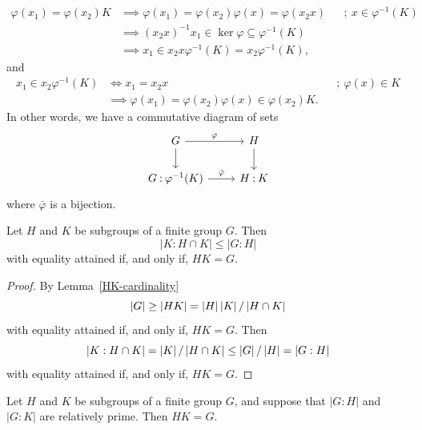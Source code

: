 \begin{rem}
\begin{enumerate}[-]
        \begin{align*}
            \varphi(x_1)=\varphi(x_2)K &\implies \varphi(x_1)=\varphi(x_2)\varphi(x)
                    =\varphi(x_2x)
                    &&;\ x\in\varphi^{-1}(K)\\
                &\implies (x_2x)^{-1}x_1\in\ker\varphi\subseteq\varphi^{-1}(K)\\
                &\implies x_1\in x_2x\varphi^{-1}(K)=x_2\varphi^{-1}(K),
        \end{align*}
        and
        \begin{align*}
            x_1\in x_2\varphi^{-1}(K)
                &\iff x_1=x_2x&&;\ \varphi(x)\in K\\
                &\implies \varphi(x_1)=\varphi(x_2)\varphi(x)\in\varphi(x_2)K. 
        \end{align*}
        In other words, we have a commutative diagram of sets
        \begin{equation}\label{diag:isomorphic-coclasses}
            \begin{tikzcd}
                G
                        \arrow[r,"\varphi"]
                        \arrow[d]
                    &H
                        \arrow[d]\\
                \lco G{\varphi^{-1}(K)}
                        \arrow[r,"\bar\varphi"]
                    &\lco HK
            \end{tikzcd}
        \end{equation}
        where $\bar\varphi$ is a bijection.
    \end{enumerate}
\end{rem}

\begin{cor}\label{index-inequality}
    Let $H$ and $K$ be subgroups of a finite group $G$. Then
    $$
        |K:H \cap K| \le |G:H|
    $$
    with equality attained if, and only if, $HK = G$.
\end{cor}

\begin{proof} By Lemma~\ref{HK-cardinality}
$$
    \left\vert{G}\right\vert\ge\left\vert{HK}\right\vert=\left\vert{H}\right\vert\left\vert{K}\right\vert/\left\vert{H\cap K}\right\vert
$$
with equality attained if, and only if, $HK=G$. Then
$$
    \left\vert{K:H\cap K}\right\vert = \left\vert{K}\right\vert/\left\vert{H\cap K}\right\vert \le \left\vert{G}\right\vert/\left\vert{H}\right\vert = \left\vert{G:H}\right\vert
$$
with equality attained if, and only if, $HK=G$.  \end{proof}

\begin{cor}\label{coprime-indices}
    Let $H$ and $K$ be subgroups of a finite group $G$, and suppose that $|G:H|$ and $|G:K|$ are relatively prime. Then $HK = G$.
\end{cor}

